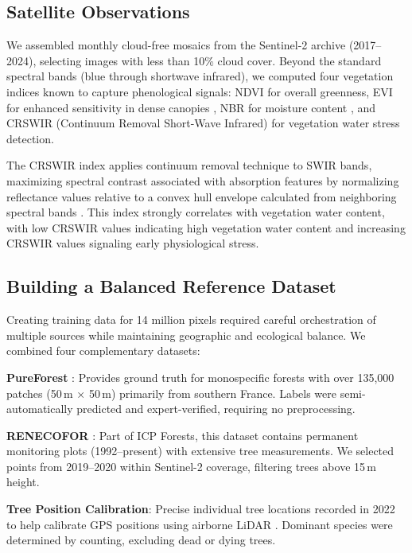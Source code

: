 \documentclass[utf8]{FrontiersinHarvard}
\begin{document}
\subsection{Satellite Observations}
We assembled monthly cloud-free mosaics from the Sentinel-2 archive (2017–2024), selecting images with less than 10\% cloud cover. Beyond the standard spectral bands (blue through shortwave infrared), we computed four vegetation indices known to capture phenological signals: NDVI for overall greenness, EVI for enhanced sensitivity in dense canopies \citep{Huete2002}, NBR for moisture content \citep{Roy2006}, and CRSWIR (Continuum Removal Short-Wave Infrared) for vegetation water stress detection.

The CRSWIR index applies continuum removal technique to SWIR bands, maximizing spectral contrast associated with absorption features by normalizing reflectance values relative to a convex hull envelope calculated from neighboring spectral bands \citep{Dutrieux2021}. This index strongly correlates with vegetation water content, with low CRSWIR values indicating high vegetation water content and increasing CRSWIR values signaling early physiological stress.

\subsection{Building a Balanced Reference Dataset}

Creating training data for 14 million pixels required careful orchestration of multiple sources while maintaining geographic and ecological balance. We combined four complementary datasets:

\textbf{PureForest} \citep{gaydon2024pureforestlargescaleaeriallidar}: Provides ground truth for monospecific forests with over 135,000 patches (50\,m × 50\,m) primarily from southern France. Labels were semi-automatically predicted and expert-verified, requiring no preprocessing.

\textbf{RENECOFOR} \citep{ulrich:hal-03444393}: Part of ICP Forests, this dataset contains permanent monitoring plots (1992–present) with extensive tree measurements. We selected points from 2019–2020 within Sentinel-2 coverage, filtering trees above 15\,m height.

\textbf{Tree Position Calibration}: Precise individual tree locations recorded in 2022 to help \citep{ONF} calibrate GPS positions using airborne LiDAR \citep{IGN_LiDARHD}. Dominant species were determined by counting, excluding dead or dying trees.
\end{document}
